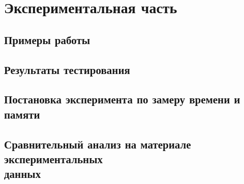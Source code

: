 \chapter{Экспериментальная часть}
\label{cha:research}

\section{Примеры работы}


\section{Результаты тестирования}

\section{Постановка эксперимента по замеру времени и памяти}

\section{Сравнительный анализ на материале экспериментальных\\ данных}

